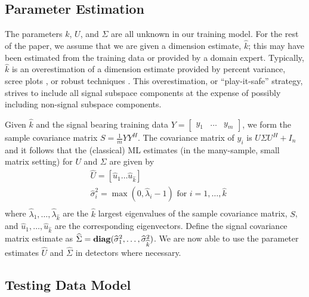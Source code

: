 \subsection{Parameter Estimation}\label{sec:ieee_msd_param_estim}

The parameters $k$, $U$, and $\Sigma$ are all unknown in our training model. For the rest of the paper, we assume that we are given a dimension estimate, $\widehat{k}$; this may have been estimated from the training data or provided by a domain expert. Typically, $\widehat{k}$ is an overestimation of a dimension estimate provided by percent variance, scree plots \cite{zhu2006automatic}, or robust techniques \cite{nadakuditi2010fundamental,johnstone2001distribution,el2007tracy}. This overestimation, or ``play-it-safe'' strategy, strives to include all signal subspace components at the expense of possibly including non-signal subspace components.

Given $\widehat{k}$ and the signal bearing training data $Y = \begin{bmatrix} y_1 & \dots & y_m \end{bmatrix}$, we form the sample covariance matrix $S=\frac{1}{m}YY^{H}$. The covariance matrix of $y_i$ is $U\Sigma U^H +I_n$ and it follows that the (classical) ML estimates (in the many-sample, small matrix setting) for $U$ and $\Sigma$ are given by \cite{muirhead1982aspects}
\begin{equation}\label{eq:chpt2:param_estims_stoch}
\begin{aligned}
&\widehat{U}=[\widehat{u}_1 \dots \widehat{u}_{\widehat{k}}]\\
&\widehat{\sigma}_i^2 = \max(0,\widehat{\lambda}_i -1) \text{ for } i=1,\dots,\widehat{k}\\
\end{aligned}
\end{equation}
where $\widehat{\lambda}_1,\dots,\widehat{\lambda}_{\widehat{k}}$ are the $\widehat{k}$  largest eigenvalues of the sample covariance matrix, $S$, and $\widehat{u}_1,\dots,\widehat{u}_{\widehat{k}}$ are the corresponding eigenvectors. Define the signal covariance matrix estimate as $\widehat{\Sigma}=\mathop{\bf diag}(\widehat{\sigma}_1^2,\dots,\widehat{\sigma}_{\widehat{k}}^2)$. We are now able to use the parameter estimates $\widehat{U}$ and $\widehat{\Sigma}$ in detectors where necessary.

\subsection{Testing Data Model}

